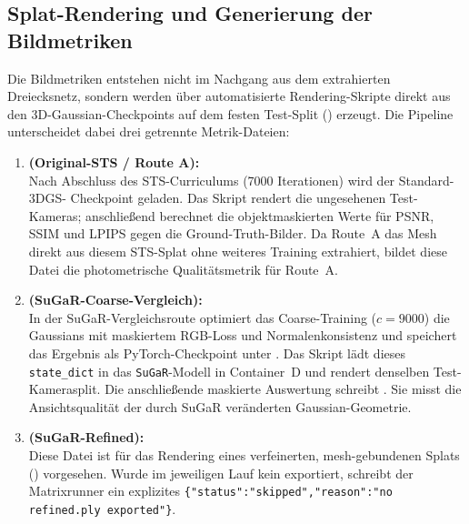 \subsection{Splat-Rendering und Generierung der Bildmetriken}

Die Bildmetriken entstehen nicht im Nachgang aus dem extrahierten Dreiecksnetz,
sondern werden über automatisierte Rendering-Skripte direkt aus den
3D-Gaussian-Checkpoints auf dem festen Test-Split ()
erzeugt. Die Pipeline unterscheidet dabei drei getrennte Metrik-Dateien:

\begin{enumerate}
  \item \textbf{ (Original-STS / Route A):}\\
        Nach Abschluss des STS-Curriculums (7000 Iterationen) wird der Standard-3DGS-
        Checkpoint  geladen. Das
        Skript  rendert die ungesehenen Test-Kameras;
        anschließend berechnet  die
        objektmaskierten Werte für PSNR, SSIM und LPIPS gegen die Ground-Truth-Bilder.
        Da Route~A das Mesh direkt aus diesem STS-Splat ohne weiteres Training
        extrahiert, bildet diese Datei die photometrische Qualitätsmetrik für Route~A.
  \item \textbf{ (SuGaR-Coarse-Vergleich):}\\
        In der SuGaR-Vergleichsroute optimiert das Coarse-Training ($c=9000$) die
        Gaussians mit maskiertem RGB-Loss und Normalenkonsistenz und speichert das
        Ergebnis als PyTorch-Checkpoint unter
        . Das Skript
         lädt dieses \texttt{state\_dict}
        in das \texttt{SuGaR}-Modell in Container~D und rendert denselben
        Test-Kamerasplit. Die anschließende maskierte Auswertung schreibt
        . Sie misst die Ansichtsqualität der durch
        SuGaR veränderten Gaussian-Geometrie.
  \item \textbf{ (SuGaR-Refined):}\\
        Diese Datei ist für das Rendering eines verfeinerten, mesh-gebundenen Splats
        () vorgesehen. Wurde im jeweiligen Lauf kein
         exportiert, schreibt der Matrixrunner ein explizites
        \texttt{\{"status":"skipped","reason":"no refined.ply exported"\}}.
\end{enumerate}

